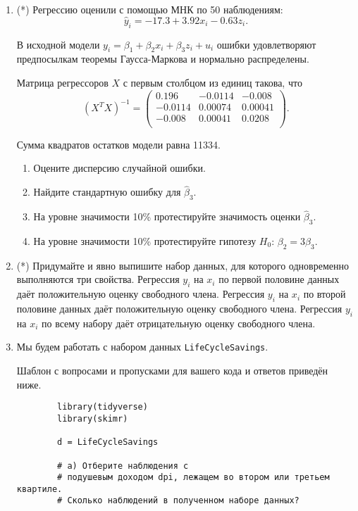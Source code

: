 \documentclass[12pt]{article}
\begin{document}
\begin{enumerate}
\newpage
    \item (*) Регрессию оценили с помощью МНК по 50 наблюдениям:
    \[
    \hat y_i = -17.3 + 3.92 x_i - 0.63 z_i.    
    \]

    В исходной модели $y_i = \beta_1 + \beta_2 x_i + \beta_3 z_i + u_i$ ошибки удовлетворяют 
    предпосылкам теоремы Гаусса-Маркова и нормально распределены.


    Матрица регрессоров $X$ с первым столбцом из единиц такова, что 
    \[
    (X^TX)^{-1} = \begin{pmatrix}
        0.196 & -0.0114 & -0.008 \\
        -0.0114 &  0.00074 & 0.00041 \\
        -0.008 & 0.00041 & 0.0208 \\
    \end{pmatrix}.    
    \]

    Сумма квадратов остатков модели равна 11334.

\begin{enumerate}
    \item Оцените дисперсию случайной ошибки.
    \item Найдите стандартную ошибку для $\hat\beta_3$.
    \item На уровне значимости 10\% протестируйте значимость оценки $\hat\beta_3$.
    \item На уровне значимости 10\% протестируйте гипотезу $H_0$: $\beta_2 = 3 \beta_3$.
\end{enumerate}


\item (*) Придумайте и явно выпишите набор данных, для которого одновременно выполняются три свойства. 
Регрессия $y_i$ на $x_i$ по первой половине данных даёт положительную оценку свободного члена.
Регрессия $y_i$ на $x_i$ по второй половине данных даёт положительную оценку свободного члена.
Регрессия $y_i$ на $x_i$ по всему набору даёт отрицательную оценку свободного члена.


\newpage
    \item Мы будем работать с набором данных \verb|LifeCycleSavings|.

    Шаблон с вопросами и пропусками для вашего кода и ответов приведён ниже. 

    \begin{verbatim}
        library(tidyverse)
        library(skimr)

        d = LifeCycleSavings

        # а) Отберите наблюдения с 
        # подушевым доходом dpi, лежащем во втором или третьем квартиле.
        # Сколько наблюдений в полученном наборе данных?


\end{verbatim}
\end{enumerate}
\end{document}
